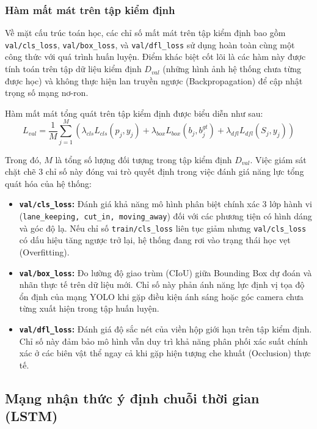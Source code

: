 	\subsubsection{Hàm mất mát trên tập kiểm định }
	
	Về mặt cấu trúc toán học, các chỉ số mất mát trên tập kiểm định bao gồm \texttt{val/cls\_loss}, \texttt{val/box\_loss}, và \texttt{val/dfl\_loss} sử dụng hoàn toàn cùng một công thức với quá trình huấn luyện. Điểm khác biệt cốt lõi là các hàm này được tính toán trên tập dữ liệu kiểm định $D_{val}$ (những hình ảnh hệ thống chưa từng được học) và không thực hiện lan truyền ngược (Backpropagation) để cập nhật trọng số mạng nơ-ron.
	
	Hàm mất mát tổng quát trên tập kiểm định được biểu diễn như sau:
	\begin{equation}
		L_{val} = \frac{1}{M} \sum_{j=1}^{M} \left( \lambda_{cls} L_{cls}(p_j, y_j) + \lambda_{box} L_{box}(b_j, b^{gt}_j) + \lambda_{dfl} L_{dfl}(S_j, y_j) \right)
	\end{equation}
	
	Trong đó, $M$ là tổng số lượng đối tượng trong tập kiểm định $D_{val}$. Việc giám sát chặt chẽ 3 chỉ số này đóng vai trò quyết định trong việc đánh giá năng lực tổng quát hóa của hệ thống:
	\begin{itemize}
		\item \textbf{\texttt{val/cls\_loss}:} Đánh giá khả năng mô hình phân biệt chính xác 3 lớp hành vi (\texttt{lane\_keeping, cut\_in, moving\_away}) đối với các phương tiện có hình dáng và góc độ lạ. Nếu chỉ số \texttt{train/cls\_loss} liên tục giảm nhưng \texttt{val/cls\_loss} có dấu hiệu tăng ngược trở lại, hệ thống đang rơi vào trạng thái học vẹt (Overfitting).
		\item \textbf{\texttt{val/box\_loss}:} Đo lường độ giao trùm (CIoU) giữa Bounding Box dự đoán và nhãn thực tế trên dữ liệu mới. Chỉ số này phản ánh năng lực định vị tọa độ ổn định của mạng YOLO khi gặp điều kiện ánh sáng hoặc góc camera chưa từng xuất hiện trong tập huấn luyện.
		\item \textbf{\texttt{val/dfl\_loss}:} Đánh giá độ sắc nét của viền hộp giới hạn trên tập kiểm định. Chỉ số này đảm bảo mô hình vẫn duy trì khả năng phân phối xác suất chính xác ở các biên vật thể ngay cả khi gặp hiện tượng che khuất (Occlusion) thực tế.
	\end{itemize}
	
	\subsection{Mạng nhận thức ý định chuỗi thời gian (LSTM)}
	
